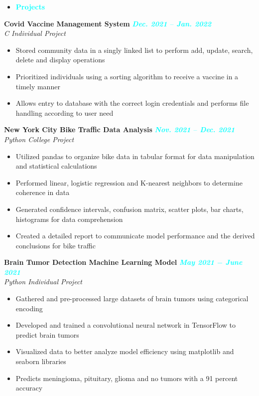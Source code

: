 \documentclass{article}
\begin{document}
\begin{itemize}[noitemsep, nolistsep, leftmargin = *]
    \item[\textcolor{cyan}{\ding{228}}]\Large{\textcolor{cyan}{\textbf{Projects}}}
    \hrulefill
\end{itemize}
\textbf{Covid Vaccine Management System} \hfill \textit{\textcolor{cyan}{\textbf{Dec. 2021 $–$ Jan. 2022}}} \\
\textit{C Individual Project}
\begin{itemize}[noitemsep, nolistsep]
    \item Stored community data in a singly linked list to perform add, update, search, delete and display operations
    \item Prioritized individuals using a sorting algorithm to receive a vaccine in a timely manner
    \item Allows entry to database with the correct login credentials and performs file handling according to user need \\
\end{itemize}
\textbf{New York City Bike Traffic Data Analysis} \hfill \textit{\textcolor{cyan}{\textbf{Nov. 2021 $–$ Dec. 2021}}} \\
\textit{Python College Project}
\begin{itemize}[noitemsep, nolistsep]
    \item Utilized pandas to organize bike data in tabular format for data manipulation and statistical calculations
    \item Performed linear, logistic regression and K-nearest neighbors to determine coherence in data
    \item Generated confidence intervals, confusion matrix, scatter plots, bar charts, histograms for data comprehension
    \item Created a detailed report to communicate model performance and the derived conclusions for bike traffic \\
\end{itemize}
\textbf{Brain Tumor Detection Machine Learning Model} \hfill \textit{\textcolor{cyan}{\textbf{May 2021 $-$ June 2021}}} \\
\textit{Python Individual Project}
\begin{itemize}[noitemsep, nolistsep]
    \item Gathered and pre-processed large datasets of brain tumors using categorical encoding
    \item Developed and trained a convolutional neural network in TensorFlow to predict brain tumors
    \item Visualized data to better analyze model efficiency using matplotlib and seaborn libraries
    \item Predicts meningioma, pituitary, glioma and no tumors with a 91 percent accuracy \\
\end{itemize}
\end{document}
